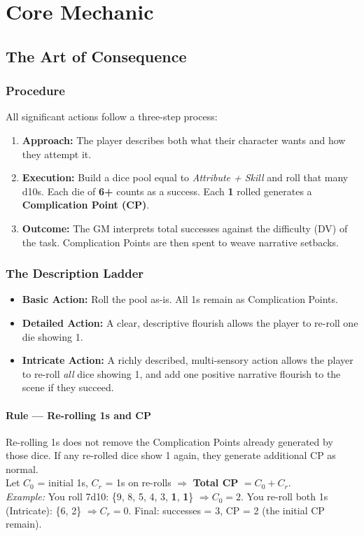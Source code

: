 

\section{Core Mechanic}

\subsection{The Art of Consequence}

\subsubsection{Procedure}
All significant actions follow a three-step process:
\begin{enumerate}
  \item \textbf{Approach:} The player describes both what their character wants and how they attempt it.
  \item \textbf{Execution:} Build a dice pool equal to \emph{Attribute + Skill} and roll that many d10s. Each die of \textbf{6+} counts as a success. Each \textbf{1} rolled generates a \textbf{Complication Point (CP)}.
  \item \textbf{Outcome:} The GM interprets total successes against the difficulty (DV) of the task. Complication Points are then spent to weave narrative setbacks.
\end{enumerate}

\subsubsection{The Description Ladder}
\begin{itemize}
  \item \textbf{Basic Action:} Roll the pool as-is. All 1s remain as Complication Points.
  \item \textbf{Detailed Action:} A clear, descriptive flourish allows the player to re-roll one die showing 1.
  \item \textbf{Intricate Action:} A richly described, multi-sensory action allows the player to re-roll \emph{all} dice showing 1, and add one positive narrative flourish to the scene if they succeed.
\end{itemize}

\paragraph{Rule — Re-rolling 1s and CP}
Re-rolling 1s does not remove the Complication Points already generated by those dice. If any re-rolled dice show 1 again, they generate additional CP as normal.\\
Let $C_0$ = initial 1s, $C_r$ = 1s on re-rolls $\Rightarrow$ \textbf{Total CP} $= C_0 + C_r$.\\
\emph{Example:} You roll 7d10: \{9, 8, 5, 4, 3, \textbf{1}, \textbf{1}\} $\Rightarrow C_0=2$. You re-roll both 1s (Intricate): \{6, 2\} $\Rightarrow C_r=0$. Final: successes = 3, CP = 2 (the initial CP remain).

